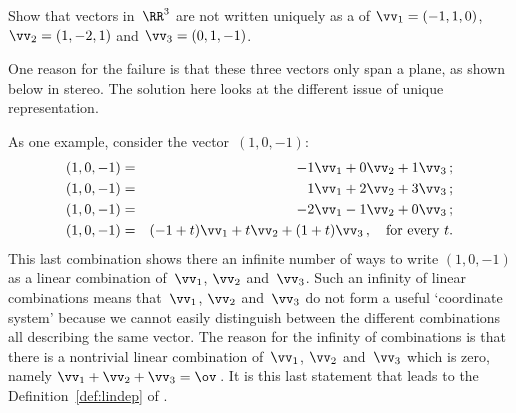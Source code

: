 \begin{example}[3D failure] \label{eg:}
Show that vectors in~\(\RR^3\) are not written uniquely as a  of \(\vv_1=(-1,1,0)\), \(\vv_2=(1,-2,1)\) and \(\vv_3=(0,1,-1)\). 

One reason for the failure is that these three vectors only span a plane, as shown below in stereo.  
The solution here looks at the different issue of unique representation.
\begin{center}
\end{center}
\begin{solution} 
As one example, consider the vector~\((1,0,-1)\):
\begin{eqnarray*}
(1,0,-1)&=&-1\vv_1+0\vv_2+1\vv_3\,;
\\(1,0,-1)&=&1\vv_1+2\vv_2+3\vv_3\,;
\\(1,0,-1)&=&-2\vv_1-1\vv_2+0\vv_3\,;
\\(1,0,-1)&=&(-1+t)\vv_1+t\vv_2+(1+t)\vv_3\,,\quad\text{for every }t.
\end{eqnarray*}
This last combination shows there an infinite number of ways to write \((1,0,-1)\) as a linear combination of~\(\vv_1\), \(\vv_2\) and~\(\vv_3\).
Such an infinity of linear combinations means that~\(\vv_1\), \(\vv_2\) and~\(\vv_3\) do not form a useful `coordinate system' because we cannot easily distinguish between the different combinations all describing the same vector.
The reason for the infinity of combinations is that there is a nontrivial linear combination of~\(\vv_1\), \(\vv_2\) and~\(\vv_3\) which is zero, namely \(\vv_1+\vv_2+\vv_3=\ov\)\,.
It is this last statement that leads to the Definition~\ref{def:lindep} of .
\end{solution}
\end{example}





